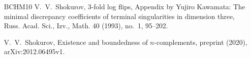 \documentclass[12pt]{amsart}
\theoremstyle{definition}
\begin{document}
\begin{thebibliography}{BCHM10}
V.~V.~Shokurov, 3-fold log flips, Appendix by Yujiro Kawamata: The minimal discrepancy coefficients of terminal singularities in dimension three, Russ. Acad. Sci., Izv., Math. 40 (1993), no.~1, 95--202.

V.~V.~Shokurov, Existence and boundedness of $n$-complements, preprint (2020), arXiv:2012.06495v1.





\end{thebibliography}
\end{document}

